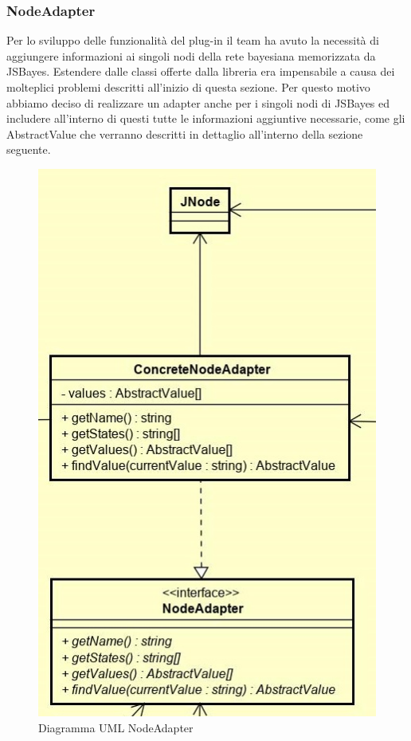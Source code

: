\subsubsection{NodeAdapter}
Per lo sviluppo delle funzionalità del plug-in il team ha avuto la necessità di aggiungere informazioni ai singoli nodi della rete bayesiana memorizzata da JSBayes.
Estendere dalle classi offerte dalla libreria era impensabile a causa dei molteplici problemi descritti all'inizio di questa sezione. Per questo motivo abbiamo deciso di realizzare un adapter anche per i singoli nodi di JSBayes ed includere all'interno di questi tutte le informazioni aggiuntive necessarie, come gli AbstractValue che verranno descritti in dettaglio all'interno della sezione seguente.
\begin{figure} [H]
	\centering
	\includegraphics[scale=0.7]{Img/NodeAdapter}
	\caption{Diagramma UML NodeAdapter}\label{}
\end{figure}
